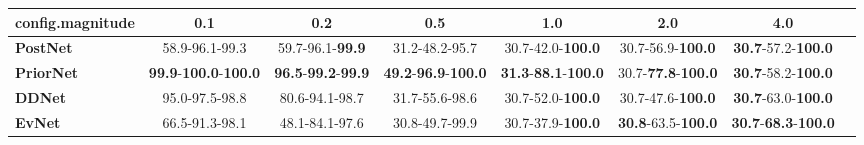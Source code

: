 \begin{tabular}{lccccccc}
\toprule
\textbf{config.magnitude} &                                          0.1 &                                        0.2 &                                         0.5 &                                         1.0 &                                2.0 &                                         4.0 \\
\midrule
\textbf{PostNet } &                               58.9-96.1-99.3 &                    59.7-96.1-\textbf{99.9} &                              31.2-48.2-95.7 &                    30.7-42.0-\textbf{100.0} &           30.7-56.9-\textbf{100.0} &           \textbf{30.7}-57.2-\textbf{100.0} \\
\textbf{PriorNet} &  \textbf{99.9}-\textbf{100.0}-\textbf{100.0} &  \textbf{96.5}-\textbf{99.2}-\textbf{99.9} &  \textbf{49.2}-\textbf{96.9}-\textbf{100.0} &  \textbf{31.3}-\textbf{88.1}-\textbf{100.0} &  30.7-\textbf{77.8}-\textbf{100.0} &           \textbf{30.7}-58.2-\textbf{100.0} \\
\textbf{DDNet   } &                               95.0-97.5-98.8 &                             80.6-94.1-98.7 &                              31.7-55.6-98.6 &                    30.7-52.0-\textbf{100.0} &           30.7-47.6-\textbf{100.0} &           \textbf{30.7}-63.0-\textbf{100.0} \\
\textbf{EvNet   } &                               66.5-91.3-98.1 &                             48.1-84.1-97.6 &                              30.8-49.7-99.9 &                    30.7-37.9-\textbf{100.0} &  \textbf{30.8}-63.5-\textbf{100.0} &  \textbf{30.7}-\textbf{68.3}-\textbf{100.0} \\
\bottomrule
\end{tabular}
